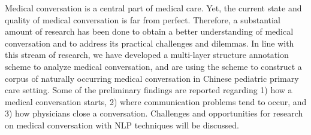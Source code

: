 Medical conversation is a central part of medical care. Yet, the current state and quality of medical conversation is far from perfect. Therefore, a substantial amount of research has been done to obtain a better understanding of medical conversation and to address its practical challenges and dilemmas. In line with this stream of research, we have developed a multi-layer structure annotation scheme to analyze medical conversation, and are using the scheme to construct a corpus of naturally occurring medical conversation in Chinese pediatric primary care setting. Some of the preliminary findings are reported regarding 1) how a medical conversation starts,  2) where communication problems tend to occur, and  3) how physicians close a conversation. Challenges and opportunities for research on medical conversation with NLP techniques will be discussed.
